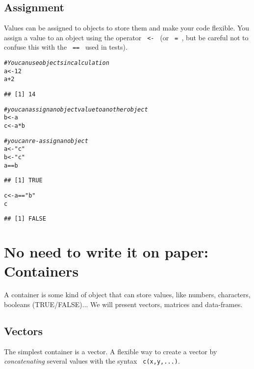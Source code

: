 \documentclass[12pt,a4paper]{scrartcl}\usepackage[]{graphicx}\usepackage[]{color}
\makeatletter
\newcommand{\hlnum}[1]{\textcolor[rgb]{0.686,0.059,0.569}{#1}}%
\newcommand{\hlstr}[1]{\textcolor[rgb]{0.192,0.494,0.8}{#1}}%
\newcommand{\hlcom}[1]{\textcolor[rgb]{0.678,0.584,0.686}{\textit{#1}}}%
\newcommand{\hlopt}[1]{\textcolor[rgb]{0,0,0}{#1}}%
\newcommand{\hlstd}[1]{\textcolor[rgb]{0.345,0.345,0.345}{#1}}%
\newcommand{\hlkwb}[1]{\textcolor[rgb]{0.69,0.353,0.396}{#1}}%
\newenvironment{kframe}{%
 \def\at@end@of@kframe{}%
 \ifinner\ifhmode%
  \def\at@end@of@kframe{\end{minipage}}%
  \begin{minipage}{\columnwidth}%
 \fi\fi%
 \def\FrameCommand##1{\hskip\@totalleftmargin \hskip-\fboxsep
 \colorbox{shadecolor}{##1}\hskip-\fboxsep
     \hskip-\linewidth \hskip-\@totalleftmargin \hskip\columnwidth}%
 \MakeFramed {\advance\hsize-\width
   \@totalleftmargin\z@ \linewidth\hsize
   \@setminipage}}%
 {\par\unskip\endMakeFramed%
 \at@end@of@kframe}
\newenvironment{knitrout}{}{} %
\makeatother
\begin{document}
\subsection{Assignment}
Values can be assigned to objects to store them and make your code flexible. You assign a value to an object using the operator \verb+ <- + (or \verb+ = +, but be careful not to confuse this with the \verb+ == + used in tests).

\begin{knitrout}
\color{fgcolor}\begin{kframe}
\begin{alltt}
\hlcom{#You can use objects in calculation}
\hlstd{a} \hlkwb{<-} \hlnum{12}
\hlstd{a} \hlopt{+} \hlnum{2}
\end{alltt}
\begin{verbatim}
## [1] 14
\end{verbatim}
\begin{alltt}
\hlcom{# you can assign an object value to another object}
\hlstd{b} \hlkwb{<-} \hlstd{a}
\hlstd{c} \hlkwb{<-} \hlstd{a}\hlopt{*}\hlstd{b}

\hlcom{# you can re-assign an object}
\hlstd{a} \hlkwb{<-} \hlstr{"c"}
\hlstd{b} \hlkwb{<-} \hlstr{"c"}
\hlstd{a} \hlopt{==} \hlstd{b}
\end{alltt}
\begin{verbatim}
## [1] TRUE
\end{verbatim}
\begin{alltt}
\hlstd{c} \hlkwb{<-} \hlstd{a} \hlopt{==} \hlstr{"b"}
\hlstd{c}
\end{alltt}
\begin{verbatim}
## [1] FALSE
\end{verbatim}
\end{kframe}
\end{knitrout}

\section{No need to write it on paper: Containers}
A container is some kind of object that can store values, like numbers, characters, booleans (TRUE/FALSE)...
We will present vectors, matrices and data-frames. 

\subsection{Vectors}
The simplest container is a vector.
A flexible way to create a vector by \textit{concatenating} several values with the syntax \verb+ c(x,y,...)+.
\end{document}
